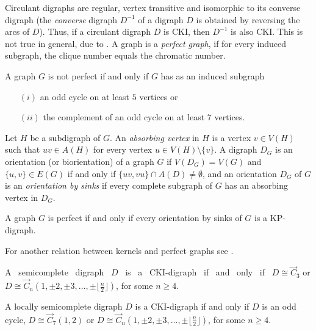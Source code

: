 Circulant digraphs are regular, vertex transitive and isomorphic to its converse digraph (the \emph{converse} digraph $D^{-1}$ of a digraph $D$ is obtained by reversing the arcs of $D$). Thus, if a circulant digraph $D$ is CKI, then $D^{-1}$ is also CKI. This is not true in general, due to  \cite{duchet1981note}.
A graph is a \emph{perfect graph}, if for every induced subgraph, the clique number equals the chromatic number.

\begin{teo}\label{T Chud}
A graph $G$ is not perfect if and only if $G$ has as an induced subgraph
\begin{enumerate}
\item[$(i)$]  an odd cycle on at least $5$ vertices or
\item[$(ii)$]  the complement of an odd cycle on at least $7$ vertices.
\end{enumerate}
\end{teo}


Let $H$ be a subdigraph of $G$. An \emph{absorbing vertex} in $H$ is a vertex  $v\in V(H)$ such that $uv\in A(H)$ for every vertex $u\in V(H)\setminus \{v\}$. A digraph $D_G$ is an orientation (or biorientation) of a graph $G$ if $V(D_G)=V(G)$ and $\{u,v\}\in E(G)$ if and only if $\{uv,vu\}\cap A(D)\neq \emptyset$, and an orientation $D_G$ of $G$ is an \emph{orientation by sinks} if every complete subgraph of $G$ has an absorbing vertex in $D_G$.

\begin{teo}\label{perf s order}
A graph $G$ is perfect if and only if every orientation by sinks of $G$ is a KP-digraph.
\end{teo}

For another relation between kernels and perfect graphs see \cite{galeana2012new}.

\begin{teo}\label{T semi}
A~ semicomplete~ digraph~ $D$~ is~ a~ CKI-digraph~ if~ and~ only~ if~ $D\cong \overrightarrow{C}_3$ or  ${D\cong \overrightarrow{C}_n(1,\pm2,\pm3,\dots,\pm\lfloor \frac{n}{2}\rfloor)}$, for some $n\ge4$.
\end{teo}

\begin{teo}\label{T local semi}
A locally semicomplete digraph $D$ is a CKI-digraph if and only if  $D$ is an odd cycle, $D\cong \overrightarrow{C}_7(1,2)$ or $D\cong \overrightarrow{C}_{n}(1,\pm 2,\pm 3,\dots,\pm \lfloor \frac{n}{2} \rfloor )$, for some $n\ge4$.
\end{teo}

